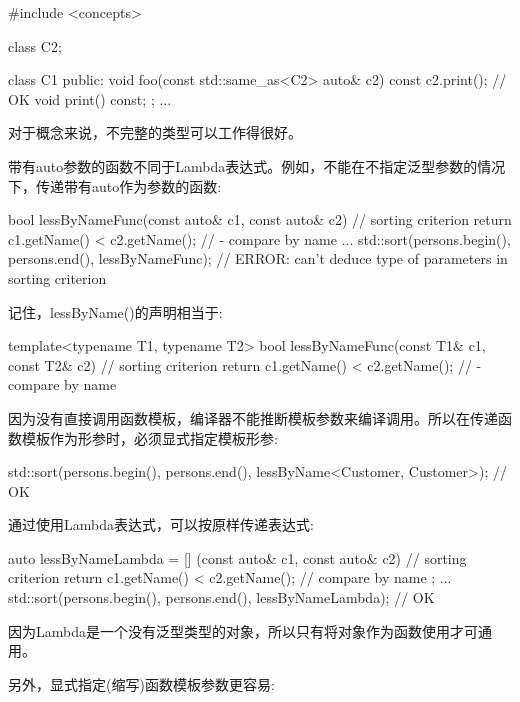 \begin{cpp}
#include <concepts>

class C2;

class C1 {
	public:
	void foo(const std::same_as<C2> auto& c2) const {
		c2.print(); // OK
	}
	void print() const;
};
...
\end{cpp}

对于概念来说，不完整的类型可以工作得很好。


带有auto参数的函数不同于Lambda表达式。例如，不能在不指定泛型参数的情况下，传递带有auto作为参数的函数:

\begin{cpp}
bool lessByNameFunc(const auto& c1, const auto& c2) { // sorting criterion
	return c1.getName() < c2.getName(); // - compare by name
}
...
std::sort(persons.begin(), persons.end(),
		  lessByNameFunc); // ERROR: can’t deduce type of parameters in sorting criterion
\end{cpp}

记住，lessByName()的声明相当于:

\begin{cpp}
template<typename T1, typename T2>
bool lessByNameFunc(const T1& c1, const T2& c2) { // sorting criterion
	return c1.getName() < c2.getName(); // - compare by name
}
\end{cpp}

因为没有直接调用函数模板，编译器不能推断模板参数来编译调用。所以在传递函数模板作为形参时，必须显式指定模板形参:

\begin{cpp}
std::sort(persons.begin(), persons.end(),
		  lessByName<Customer, Customer>); // OK
\end{cpp}

通过使用Lambda表达式，可以按原样传递表达式:

\begin{cpp}
auto lessByNameLambda = [] (const auto& c1, const auto& c2) { // sorting criterion
							return c1.getName() < c2.getName(); // compare by name
						};
...
std::sort(persons.begin(), persons.end(),
		  lessByNameLambda); // OK
\end{cpp}

因为Lambda是一个没有泛型类型的对象，所以只有将对象作为函数使用才可通用。

另外，显式指定(缩写)函数模板参数更容易:

